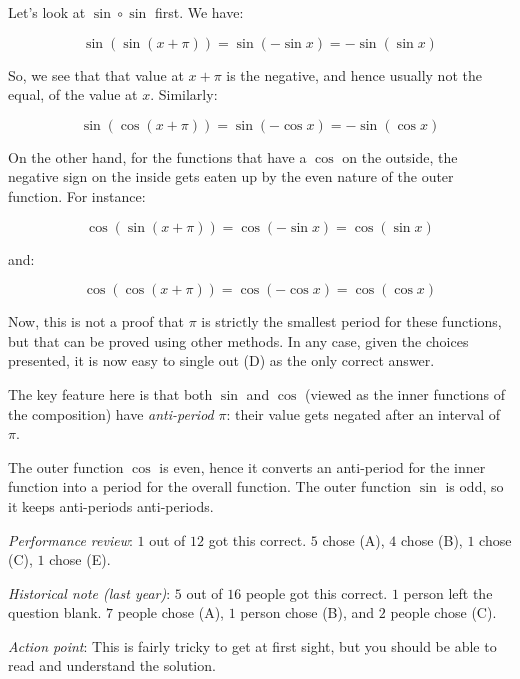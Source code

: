\documentclass[10pt]{amsart}
\begin{document}
\begin{enumerate}
  Let's look at $\sin \circ \sin$ first. We have:

  $$\sin(\sin(x + \pi)) = \sin(-\sin x) = - \sin(\sin x)$$

  So, we see that that value at $x + \pi$ is the negative, and hence
  usually not the equal, of the value at $x$. Similarly:

  $$\sin(\cos(x + \pi)) = \sin(-\cos x) = -\sin(\cos x)$$

  On the other hand, for the functions that have a $\cos$ on the
  outside, the negative sign on the inside gets eaten up by the even
  nature of the outer function. For instance:

  $$\cos(\sin(x + \pi)) = \cos(-\sin x) = \cos(\sin x)$$

  and:

  $$\cos(\cos(x + \pi)) = \cos(-\cos x) = \cos(\cos x)$$

  Now, this is not a proof that $\pi$ is strictly the smallest period
  for these functions, but that can be proved using other methods. In
  any case, given the choices presented, it is now easy to single out
  (D) as the only correct answer.

  The key feature here is that both $\sin$ and $\cos$ (viewed as the
  inner functions of the composition) have {\em anti-period} $\pi$:
  their value gets negated after an interval of $\pi$.

  The outer function $\cos$ is even, hence it converts an anti-period
  for the inner function into a period for the overall function. The
  outer function $\sin$ is odd, so it keeps anti-periods anti-periods.

  {\em Performance review}: $1$ out of $12$ got this correct. $5$
  chose (A), $4$ chose (B), $1$ chose (C), $1$ chose (E).


  {\em Historical note (last year)}: $5$ out of $16$ people got this
  correct. $1$ person left the question blank. $7$ people chose (A),
  $1$ person chose (B), and $2$ people chose (C).

  {\em Action point}: This is fairly tricky to get at first sight, but
  you should be able to read and understand the solution.
\end{enumerate}
\end{document}
